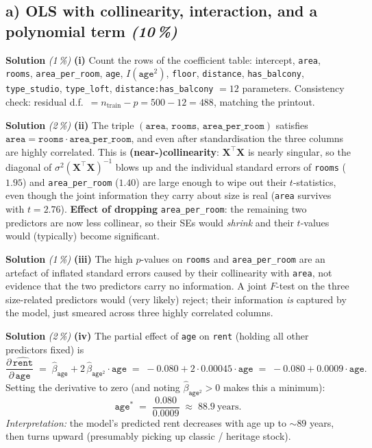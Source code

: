 \documentclass[11pt,a4paper]{article}
\newcommand{\subpoints}[1]{\textit{(#1\,\%)}}
\newcommand{\sol}{\noindent\textbf{Solution}}
\begin{document}
\subsection*{a) OLS with collinearity, interaction, and a polynomial term \subpoints{10}}

\sol{} \subpoints{1} \textbf{(i)} Count the rows of the coefficient table: intercept,
\texttt{area}, \texttt{rooms}, \texttt{area\_per\_room}, \texttt{age}, $I(\texttt{age}^2)$,
\texttt{floor}, \texttt{distance}, \texttt{has\_balcony}, \texttt{type\_studio},
\texttt{type\_loft}, \texttt{distance:has\_balcony} $=\boxed{12}$ parameters. Consistency check:
residual d.f.\ $=n_\text{train}-p = 500-12 = 488$, matching the printout. \checkmark

\medskip
\sol{} \subpoints{2} \textbf{(ii)} The triple $(\texttt{area},\,\texttt{rooms},\,\texttt{area\_per\_room})$
satisfies $\texttt{area} = \texttt{rooms}\cdot\texttt{area\_per\_room}$, and even after
standardisation the three columns are highly correlated. This is \textbf{(near-)collinearity}:
$\mathbf X^\top\mathbf X$ is nearly singular, so the diagonal of $\sigma^2(\mathbf X^\top\mathbf X)^{-1}$
blows up and the individual standard errors of \texttt{rooms} ($1.95$) and
\texttt{area\_per\_room} ($1.40$) are large enough to wipe out their $t$-statistics, even though
the joint information they carry about size is real (\texttt{area} survives with $t=2.76$).
\textbf{Effect of dropping} \texttt{area\_per\_room}: the remaining two predictors are now less
collinear, so their SEs would \emph{shrink} and their $t$-values would (typically) become
significant.

\medskip
\sol{} \subpoints{1} \textbf{(iii)} The high $p$-values on \texttt{rooms} and
\texttt{area\_per\_room} are an artefact of inflated standard errors caused by their collinearity
with \texttt{area}, not evidence that the two predictors carry no information. A joint $F$-test on
the three size-related predictors would (very likely) reject; their information \emph{is} captured
by the model, just smeared across three highly correlated columns.

\medskip
\sol{} \subpoints{2} \textbf{(iv)} The partial effect of \texttt{age} on \texttt{rent} (holding
all other predictors fixed) is
$$\frac{\partial\,\widehat{\texttt{rent}}}{\partial\,\texttt{age}}
   \;=\; \hat\beta_{\texttt{age}} + 2\,\hat\beta_{\texttt{age}^2}\cdot \texttt{age}
   \;=\; -0.080 + 2\cdot 0.00045\cdot\texttt{age}
   \;=\; -0.080 + 0.0009\cdot\texttt{age}.$$
Setting the derivative to zero (and noting $\hat\beta_{\texttt{age}^2} > 0$ makes this a minimum):
$$\texttt{age}^* \;=\; \frac{0.080}{0.0009} \;\approx\; \boxed{88.9\ \text{years}}.$$
\emph{Interpretation:} the model's predicted rent decreases with age up to $\sim 89$ years, then
turns upward (presumably picking up classic / heritage stock).
\end{document}

